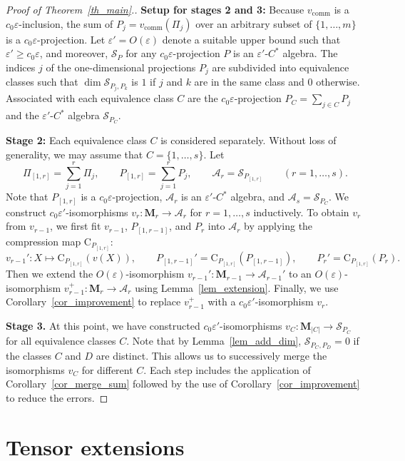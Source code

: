 \documentclass[12pt]{article}
\newcommand{\calA}{\mathcal{A}}
\newcommand{\calS}{\mathcal{S}}
\newcommand{\comm}{\mathrm{comm}}
\newcommand{\Co}{\mathrm{C}}
\newcommand*{\Ma}[1]{\mathbf{M}_{#1}}
\newcommand{\eps}{\varepsilon}
\renewcommand{\ge}{\geqslant}
\newtheorem[definition]{Definition}[Theorem]{Definition}
\newtheorem[remark]{Example}[Theorem]{Example}
\newtheorem[remark]{Remark}[Theorem]{Remark}
\newtheorem[remark]{Question}[Theorem]{Open question}
\newtheorem*[definition]{definition}{Definition}
\newtheorem*[remark]{example}{Example}
\newtheorem*[remark]{remark}{Remark}
\newtheorem*[remark]{question}{Open question}
\numberwithin{equation}{section}
\begin{document}
\begin{proof}[Proof of Theorem~\ref{th_main}.]
\noindent\textbf{Setup for stages 2 and 3:} Because $v_\comm$ is a $c_0\eps$-inclusion, the sum of $P_j=v_\comm(\Pi_j)$ over an arbitrary subset of $\{1,\dots,m\}$ is a $c_0\eps$-projection. Let $\eps'=O(\eps)$ denote a suitable upper bound such that $\eps'\ge c_0\eps$, and moreover, $\calS_P$ for any $c_0\eps$-projection $P$ is an $\eps'$-$C^*$ algebra. The indices $j$ of the one-dimensional projections $P_j$ are subdivided into equivalence classes such that $\dim\calS_{P_j,P_k}$ is $1$ if $j$ and $k$ are in the same class and $0$ otherwise. Associated with each equivalence class $C$ are the $c_0\eps$-projection $P_C=\sum_{j\in C}P_j$ and the $\eps'$-$C^*$ algebra $\calS_{P_C}$.\medskip

\noindent\textbf{Stage 2:} Each equivalence class $C$ is considered separately. Without loss of generality, we may assume that $C=\{1,\dots,s\}$. Let
\[
\Pi_{[1,r]}=\sum_{j=1}^{r}\Pi_j,\qquad P_{[1,r]}=\sum_{j=1}^{r}P_j,\qquad
\calA_r=\calS_{P_{[1,r]}}\qquad (r=1,\dots,s).
\]
Note that $P_{[1,r]}$ is a $c_0\eps$-projection, $\calA_r$ is an $\eps'$-$C^*$ algebra, and $\calA_s=\calS_{P_C}$. We construct $c_0\eps'$-isomorphisms $v_r\colon\Ma{r}\to\calA_r$ for $r=1,\dots,s$ inductively. To obtain $v_r$ from $v_{r-1}$, we first fit $v_{r-1}$, $P_{[1,r-1]}$, and $P_r$ into $\calA_r$ by applying the compression map $\Co_{P_{[1,r]}}$:
\[
v_{r-1}'\colon X\mapsto\Co_{P_{[1,r]}}(v(X)),\qquad
P_{[1,r-1]}'=\Co_{P_{[1,r]}}(P_{[1,r-1]}),\qquad
P_r'=\Co_{P_{[1,r]}}(P_r).
\]
Then we extend the $O(\eps)$-isomorphism $v_{r-1}'\colon \Ma{r-1}\to\calA_{r-1}'$ to an $O(\eps)$-isomorphism $v_{r-1}^+\colon \Ma{r}\to\calA_{r}$ using Lemma~\ref{lem_extension}. Finally, we use Corollary~\ref{cor_improvement} to replace $v_{r-1}^+$ with a $c_0\eps'$-isomorphism $v_r$.\medskip

\noindent\textbf{Stage 3.} At this point, we have constructed $c_0\eps'$-isomorphisms $v_C\colon\Ma{|C|}\to\calS_{P_C}$ for all equivalence classes $C$. Note that by Lemma~\ref{lem_add_dim}, $\calS_{P_C,P_D}=0$ if the classes $C$ and $D$ are distinct. This allows us to successively merge the isomorphisms $v_C$ for different $C$. Each step includes the application of Corollary~\ref{cor_merge_sum} followed by the use of Corollary~\ref{cor_improvement} to reduce the errors.
\end{proof}


\section{Tensor extensions}\label{sec_tens_ext}
\end{document}
